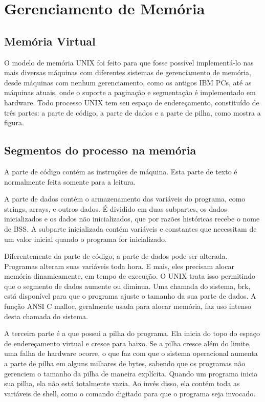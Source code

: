 \chapter{Gerenciamento de Memória}

\section{Memória Virtual}

O modelo de memória UNIX foi feito para que fosse possível implementá-lo nas mais diversas máquinas com diferentes sistemas de gerenciamento de memória, desde máquinas com nenhum gerenciamento, como os antigos IBM PCs, até as máquinas atuais, onde o suporte a paginação e segmentação é implementado em hardware. Todo processo UNIX tem seu espaço de endereçamento, constituído de três partes: a parte de código, a parte de dados e a parte de pilha, como mostra a figura.

\section{Segmentos do processo na memória}

A parte de código contém as instruções de máquina. Esta parte de texto é normalmente feita somente para a leitura.

A parte de dados contém o armazenamento das variáveis do programa, como strings, arrays, e outros dados. É dividido em duas subpartes, os dados inicializados e os dados não inicializados, que por razões históricas recebe o nome de BSS. A subparte inicializada contém variáveis e constantes que necessitam de um valor inicial quando o programa for inicializado.

Diferentemente da parte de código, a parte de dados pode ser alterada. Programas alteram suas variáveis toda hora. E mais, eles precisam alocar memória dinamicamente, em tempo de execução. O UNIX trata isso permitindo que o segmento de dados aumente ou diminua. Uma chamada do sistema, brk, está disponível para que o programa ajuste o tamanho da sua parte de dados. A função ANSI C malloc, geralmente usada para alocar memória, faz uso intenso desta chamada do sistema.

A terceira parte é a que possui a pilha do programa. Ela inicia do topo do espaço de endereçamento virtual e cresce para baixo. Se a pilha cresce além do limite, uma falha de hardware ocorre, o que faz com que o sistema operacional aumenta a parte de pilha em alguns milhares de bytes, sabendo que os programas não gerenciem o tamanho da pilha de maneira explícita. Quando um programa inicia sua pilha, ela não está totalmente vazia. Ao invés disso, ela contém toda as variáveis de shell, como o comando digitado para que o programa seja invocado.

